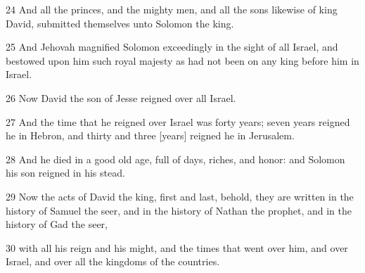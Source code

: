 \par 24 And all the princes, and the mighty men, and all the sons likewise of king David, submitted themselves unto Solomon the king.
\par 25 And Jehovah magnified Solomon exceedingly in the sight of all Israel, and bestowed upon him such royal majesty as had not been on any king before him in Israel.
\par 26 Now David the son of Jesse reigned over all Israel.
\par 27 And the time that he reigned over Israel was forty years; seven years reigned he in Hebron, and thirty and three [years] reigned he in Jerusalem.
\par 28 And he died in a good old age, full of days, riches, and honor: and Solomon his son reigned in his stead.
\par 29 Now the acts of David the king, first and last, behold, they are written in the history of Samuel the seer, and in the history of Nathan the prophet, and in the history of Gad the seer,
\par 30 with all his reign and his might, and the times that went over him, and over Israel, and over all the kingdoms of the countries.

